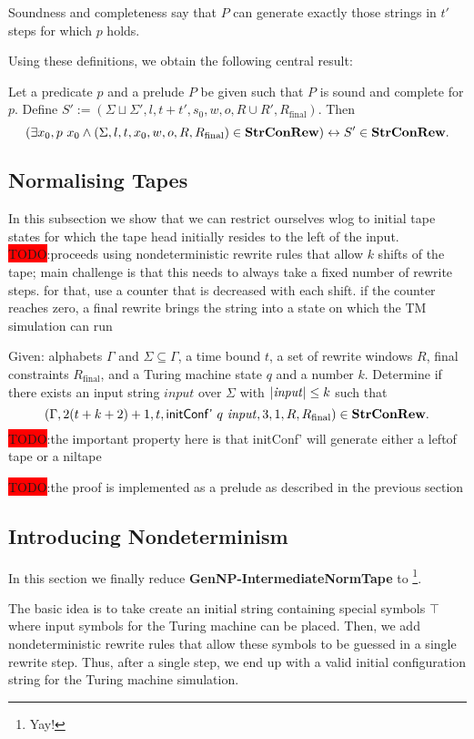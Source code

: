 \documentclass[a4paper,UKenglish,cleveref, autoref]{lipics-v2019}
\newcommand{\TODO}[1]{\colorbox{red}{\LARGE TODO}:#1}
\newcommand{\Rfinal}{R_{\text{final}}}
\begin{document}
Soundness and completeness say that $P$ can generate exactly those strings in $t'$ steps for which $p$ holds. 

Using these definitions, we obtain the following central result:
\begin{lemma}
  Let a predicate $p$ and a prelude $P$ be given such that $P$ is sound and complete for $p$. 
  Define $S' := (\Sigma \sqcup \Sigma', l, t + t', s_0, w, o, R \cup R', \Rfinal)$.
  Then 
  \[(\exists x_0, p~x_0 \land (\Sigma, l, t, x_0, w, o, R, \Rfinal) \in \strconrew{}) \leftrightarrow S' \in \strconrew{}. \]
\end{lemma}

\subsection{Normalising Tapes}
In this subsection we show that we can restrict ourselves wlog to initial tape states for which the tape head initially resides to the left of the input. 
\TODO{proceeds using nondeterministic rewrite rules that allow $k$ shifts of the tape; main challenge is that this needs to always take a fixed number of rewrite steps. for that, use a counter that is decreased with each shift. if the counter reaches zero, a final rewrite brings the string into a state on which the TM simulation can run}

\begin{definition}
  Given: alphabets $\Gamma$ and $\Sigma \subseteq \Gamma$, a time bound $t$, a set of rewrite windows $R$, final constraints $\Rfinal$, and a Turing machine state $q$ and a number $k$. 
  Determine if there exists an input string $\mathit{input}$ over $\Sigma$ with $|\mathit{input}| \le k$ such that 
  \[(\Gamma, 2 (t + k + 2) + 1, t, \textsf{initConf'}~q~\mathit{input}, 3, 1, R, \Rfinal) \in \strconrew{}.\]
  \TODO{the important property here is that initConf' will generate either a leftof tape or a niltape}
\end{definition}

\TODO{the proof is implemented as a prelude as described in the previous section}

\subsection{Introducing Nondeterminism}
In this section we finally reduce \textbf{GenNP-IntermediateNormTape} to \strconrew{}\footnote{Yay!}. 

The basic idea is to take create an initial string containing special symbols $\top$ where input symbols for the Turing machine can be placed. Then, we add nondeterministic rewrite rules that allow these symbols to be guessed in a single rewrite step. Thus, after a single step, we end up with a valid initial configuration string for the Turing machine simulation.
\end{document}
